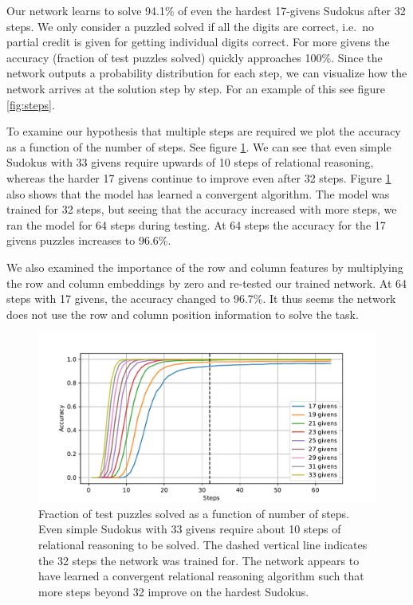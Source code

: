 \documentclass{article}
\begin{document}
Our network learns to solve 94.1\% of even the hardest 17-givens Sudokus after 32 steps. We only consider a puzzled solved if all the digits are correct, i.e.~no partial credit is given for getting individual digits correct. For more givens the accuracy (fraction of test puzzles solved) quickly approaches 100\%. Since the network outputs a probability distribution for each step, we can visualize how the network arrives at the solution step by step. For an example of this see figure \ref{fig:steps}.

To examine our hypothesis that multiple steps are required we plot the accuracy as a function of the number of steps. See figure \ref{fig:sudoku-acc}. We can see that even simple Sudokus with 33 givens require upwards of 10 steps of relational reasoning, whereas the harder 17 givens continue to improve even after 32 steps. Figure \ref{fig:sudoku-acc} also shows that the model has learned a convergent algorithm. The model was trained for 32 steps, but seeing that the accuracy increased with more steps, we ran the model for 64 steps during testing. At 64 steps the accuracy for the 17 givens puzzles increases to 96.6\%.

We also examined the importance of the row and column features by multiplying the row and column embeddings by zero and re-tested our trained network. At 64 steps with 17 givens, the accuracy changed to 96.7\%. It thus seems the network does not use the row and column position information to solve the task.

\begin{figure}[ht]
\vspace{-10pt}
\centering
\includegraphics[width=1.0\textwidth]{figures/64-graph-puzzle-acc.pdf}
\caption{Fraction of test puzzles solved as a function of number of steps. Even simple Sudokus with 33 givens require about 10 steps of relational reasoning to be solved. The dashed vertical line indicates the 32 steps the network was trained for. The network appears to have learned a convergent relational reasoning algorithm such that more steps beyond 32 improve on the hardest Sudokus.}
\label{fig:sudoku-acc}
\end{figure}
\end{document}
